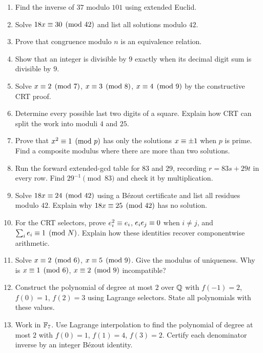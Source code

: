 

\begin{exercisebox}
\begin{enumerate}
  \item Find the inverse of $37$ modulo $101$ using extended Euclid. 
  \item Solve $18x\equiv30\pmod{42}$ and list all solutions modulo $42$. 
  \item Prove that congruence modulo $n$ is an equivalence relation. 
  \item Show that an integer is divisible by $9$ exactly when its decimal digit sum is divisible by $9$. 
  \item Solve $x\equiv2\pmod7$, $x\equiv3\pmod8$, $x\equiv4\pmod9$ by the constructive CRT proof. 
  \item Determine every possible last two digits of a square. Explain how CRT can split the work into moduli $4$ and $25$. 
  \item Prove that $x^2\equiv1\pmod p$ has only the solutions $x\equiv\pm1$ when $p$ is prime. Find a composite modulus where there are more than two solutions. 
  \item Run the forward extended-gcd table for $83$ and $29$, recording
  $r=83s+29t$ in every row. Find $29^{-1}\pmod{83}$ and check it by
  multiplication. 
  \item Solve $18x\equiv24\pmod{42}$ using a B\'ezout certificate and
  list all residues modulo $42$. Explain why $18x\equiv25\pmod{42}$
  has no solution. 
  \item For the CRT selectors, prove $e_i^2\equiv e_i$,
  $e_ie_j\equiv0$ when $i\ne j$, and $\sum_i e_i\equiv1\pmod N$.
  Explain how these identities recover componentwise arithmetic.
  \item Solve $x\equiv2\pmod6$, $x\equiv5\pmod9$. Give the modulus
  of uniqueness. Why is $x\equiv1\pmod6$, $x\equiv2\pmod9$
  incompatible? 
  \item Construct the polynomial of degree at most $2$ over $\mathbb Q$ with
  $f(-1)=2$, $f(0)=1$, $f(2)=3$ using Lagrange selectors.
  State all polynomials with these values. 
  \item Work in $\mathbb F_7$. Use Lagrange interpolation to find the
  polynomial of degree at most $2$ with $f(0)=1$, $f(1)=4$, $f(3)=2$.
  Certify each denominator inverse by an integer B\'ezout identity.

\end{enumerate}
\end{exercisebox}

